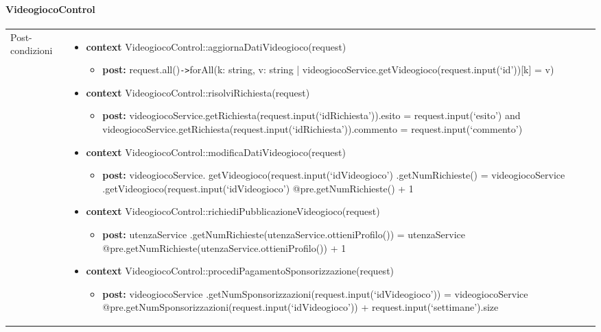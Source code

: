 \paragraph{VideogiocoControl}
\small\begin{tabular}{|| l | p{28em} ||} 
\hline
Post-condizioni & \begin{itemize}[leftmargin=*]
	\item \textbf{context} VideogiocoControl::aggiornaDatiVideogioco(request)
	\begin{itemize}
		\item[ ] \textbf{post:} request.all()\verb|->|forAll(k: string, v: string | videogiocoService.getVideogioco(request.input(‘id’))[k] = v)	
	\end{itemize}

	\item \textbf{context} VideogiocoControl::risolviRichiesta(request)
	\begin{itemize}
		\item[ ] \textbf{post:} videogiocoService.getRichiesta(request.input(‘idRichiesta’)).esito = request.input(‘esito’) and videogiocoService.getRichiesta(request.input(‘idRichiesta’)).commento = request.input(‘commento’)
	\end{itemize}

	\item \textbf{context} VideogiocoControl::modificaDatiVideogioco(request)
	\begin{itemize}
		\item[ ] \textbf{post:} videogiocoService.
		getVideogioco(request.input(‘idVideogioco’)
		.getNumRichieste() =
		videogiocoService
		.getVideogioco(request.input(‘idVideogioco’)
		@pre.getNumRichieste() + 1	
	\end{itemize}

	\item \textbf{context} VideogiocoControl\newline ::richiediPubblicazioneVideogioco(request)
	\begin{itemize}
		\item[ ] \textbf{post:} utenzaService
		.getNumRichieste(utenzaService.ottieniProfilo()) =
		utenzaService
		@pre.getNumRichieste(utenzaService.ottieniProfilo()) + 1	
	\end{itemize}

	\item \textbf{context} VideogiocoControl\newline ::procediPagamentoSponsorizzazione(request)
	\begin{itemize}
		\item[ ] \textbf{post:} videogiocoService
		.getNumSponsorizzazioni(request.input(‘idVideogioco’)) =
		videogiocoService
		\newline @pre.getNumSponsorizzazioni(request\newline .input(‘idVideogioco’)) + request.input(‘settimane’).size	
	\end{itemize}


\end{itemize}
\end{tabular}
